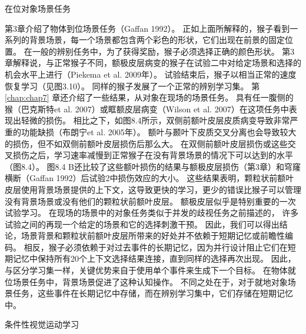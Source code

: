 在位对象场景任务

第3章介绍了物体到位场景任务（Gaffan 1992）。
正如上面所解释的，猴子看到一系列的背景场景，每一个场景都包含两个彩色的形状，它们出现在前景的固定位置。
在一般的辨别任务中，为了获得奖励，猴子必须选择正确的颜色形状。
第3章解释说，与正常猴子不同，额极皮层病变的猴子在试验二中对给定场景和选择的机会水平上进行（Piekema et al. 2009年）。
试验结束后，猴子以相当正常的速度恢复学习（见图3.10）。
同样的猴子发展了一个正常的辨别学习集。
第 \ref{chap:chap7} 章还介绍了一些结果，从对象在现场的场景任务。
具有任一腹侧的猴（巴克斯特et al. 2007）或眶额皮层病变（Wilson et al. 2007）在这项任务中表现出轻微的损伤。
相比之下，如图8.4所示，双侧前额叶皮层皮质病变导致非常严重的功能缺损（布朗宁et al. 2005年）。
额叶与颞叶下皮质交叉分离也会导致较大的损伤，但不如双侧前额叶皮层损伤后那么大。
在双侧前额叶皮层损伤或这些交叉损伤之后，学习速率减慢到正常猴子在没有背景场景的情况下可以达到的水平（图8.4）。
图8.4 B还比较了这些额叶损伤的结果与额极皮层损伤（第3章）和穹窿横断（Gaffan 1992）后试验2中损伤效应的大小。
这些结果表明，颗粒状前额叶皮层使用背景场景提供的上下文，这导致更快的学习，更少的错误比猴子可以管理没有背景场景或没有他们的颗粒状前额叶皮层。
额极皮层似乎是特别重要的一次试验学习。
在现场的场景中的对象任务类似于并发的歧视任务之前描述的，
许多试验之间的再现一个给定的场景和它的选择刺激干预。
因此，我们可以得出结论，场景背景和颗粒状前额叶皮层所带来的好处并不依赖于短期记忆或前瞻性编码。
相反，猴子必须依赖于对过去事件的长期记忆，因为并行设计阻止它们在短期记忆中保持所有20个上下文选择结果连接，直到同样的选择再次出现。
因此，与区分学习集一样，关键优势来自于使用单个事件来生成下一个目标。
在物体就位场景任务中，背景场景促进了这种认知操作。
不同之处在于，对于就地对象场景任务，这些事件在长期记忆中存储，而在辨别学习集中，它们存储在短期记忆中。



条件性视觉运动学习

